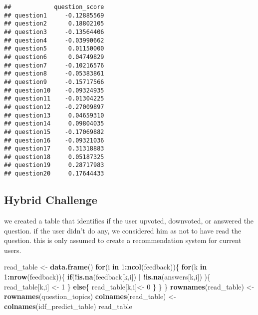 \documentclass[]{article}
\newenvironment{Shaded}{\begin{snugshade}}{\end{snugshade}}
\newcommand{\ControlFlowTok}[1]{\textcolor[rgb]{0.13,0.29,0.53}{\textbf{#1}}}
\newcommand{\DecValTok}[1]{\textcolor[rgb]{0.00,0.00,0.81}{#1}}
\newcommand{\KeywordTok}[1]{\textcolor[rgb]{0.13,0.29,0.53}{\textbf{#1}}}
\newcommand{\NormalTok}[1]{#1}
\newcommand{\OperatorTok}[1]{\textcolor[rgb]{0.81,0.36,0.00}{\textbf{#1}}}
\newcommand{\StringTok}[1]{\textcolor[rgb]{0.31,0.60,0.02}{#1}}
\begin{document}
\begin{verbatim}
##            question_score
## question1     -0.12885569
## question2      0.18802105
## question3     -0.13564406
## question4     -0.03990662
## question5      0.01150000
## question6      0.04749829
## question7     -0.10216576
## question8     -0.05383861
## question9     -0.15717566
## question10    -0.09324935
## question11    -0.01304225
## question12    -0.27009897
## question13     0.04659310
## question14     0.09804035
## question15    -0.17069882
## question16    -0.09321036
## question17     0.31318883
## question18     0.05187325
## question19     0.28717983
## question20     0.17644433
\end{verbatim}

\hypertarget{hybrid-challenge}{%
\subsection{Hybrid Challenge}\label{hybrid-challenge}}

we created a table that identifies if the user upvoted, downvoted, or
answered the question. if the user didn't do any, we considered him as
not to have read the question. this is only assumed to create a
recommendation system for current users.

\begin{Shaded}
\begin{Highlighting}[]
\NormalTok{read_table <-}\StringTok{ }\KeywordTok{data.frame}\NormalTok{()}
\ControlFlowTok{for}\NormalTok{(i }\ControlFlowTok{in} \DecValTok{1}\OperatorTok{:}\KeywordTok{ncol}\NormalTok{(feedback))\{}
  \ControlFlowTok{for}\NormalTok{(k }\ControlFlowTok{in} \DecValTok{1}\OperatorTok{:}\KeywordTok{nrow}\NormalTok{(feedback))\{}
  \ControlFlowTok{if}\NormalTok{(}\OperatorTok{!}\KeywordTok{is.na}\NormalTok{(feedback[k,i]) }\OperatorTok{|}\StringTok{ }\OperatorTok{!}\KeywordTok{is.na}\NormalTok{(answers[k,i]) )\{}
\NormalTok{    read_table[k,i] <-}\StringTok{ }\DecValTok{1}
\NormalTok{  \}}
    \ControlFlowTok{else}\NormalTok{\{}
\NormalTok{      read_table[k,i]<-}\StringTok{ }\DecValTok{0}
\NormalTok{    \}}
\NormalTok{  \}}
\NormalTok{\}}
\KeywordTok{rownames}\NormalTok{(read_table) <-}\StringTok{ }\KeywordTok{rownames}\NormalTok{(question_topics)}
\KeywordTok{colnames}\NormalTok{(read_table) <-}\StringTok{ }\KeywordTok{colnames}\NormalTok{(idf_predict_table)}
\NormalTok{read_table}
\end{Highlighting}
\end{Shaded}
\end{document}
